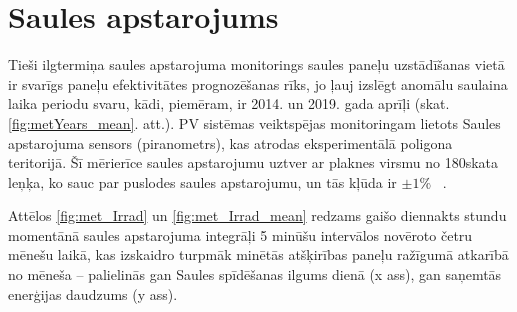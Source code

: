 \section{Saules apstarojums}


Tieši ilgtermiņa saules apstarojuma monitorings saules paneļu uzstādīšanas vietā ir svarīgs paneļu efektivitātes prognozēšanas rīks, jo ļauj izslēgt anomālu saulaina laika periodu svaru, kādi, piemēram, ir 2014. un 2019. gada aprīļi (skat. \ref{fig:metYears_mean}. att.). PV sistēmas veiktspējas monitoringam lietots Saules apstarojuma sensors (piranometrs), kas atrodas eksperimentālā poligona teritorijā. Šī mērierīce saules apstarojumu uztver ar plaknes virsmu no 180\textdegree skata leņķa, ko sauc par puslodes saules apstarojumu, un tās kļūda ir  $\pm 1 \%$ ~\cite{pyranometer}.

Attēlos \ref{fig:met_Irrad} un \ref{fig:met_Irrad_mean} redzams gaišo diennakts stundu momentānā saules apstarojuma integrāļi 5 minūšu intervālos novēroto četru mēnešu laikā, kas izskaidro turpmāk minētās atšķirības paneļu ražīgumā atkarībā no mēneša -- palielinās gan Saules spīdēšanas ilgums dienā (x ass), gan saņemtās enerģijas daudzums (y ass).

